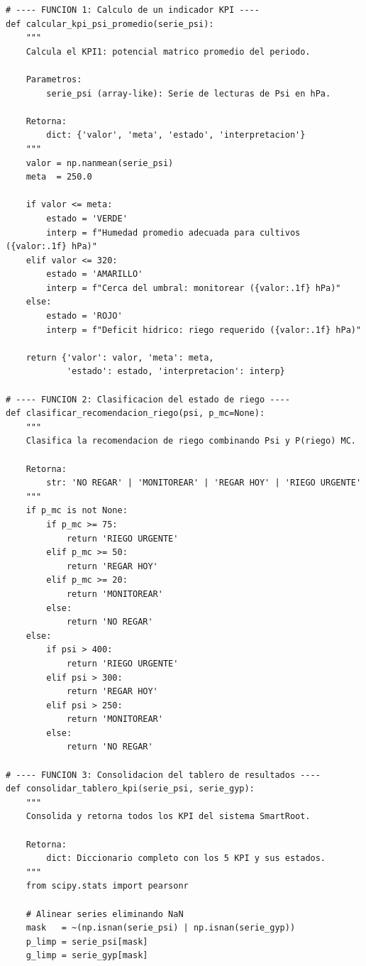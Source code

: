 \documentclass[12pt,a4paper]{article}
\begin{document}
\begin{lstlisting}[caption={Funciones para cálculo de indicadores, clasificación y consolidación de resultados.}, label=lst:funciones]
# ---- FUNCION 1: Calculo de un indicador KPI ----
def calcular_kpi_psi_promedio(serie_psi):
    """
    Calcula el KPI1: potencial matrico promedio del periodo.
    
    Parametros:
        serie_psi (array-like): Serie de lecturas de Psi en hPa.
    
    Retorna:
        dict: {'valor', 'meta', 'estado', 'interpretacion'}
    """
    valor = np.nanmean(serie_psi)
    meta  = 250.0
    
    if valor <= meta:
        estado = 'VERDE'
        interp = f"Humedad promedio adecuada para cultivos ({valor:.1f} hPa)"
    elif valor <= 320:
        estado = 'AMARILLO'
        interp = f"Cerca del umbral: monitorear ({valor:.1f} hPa)"
    else:
        estado = 'ROJO'
        interp = f"Deficit hidrico: riego requerido ({valor:.1f} hPa)"
    
    return {'valor': valor, 'meta': meta, 
            'estado': estado, 'interpretacion': interp}

# ---- FUNCION 2: Clasificacion del estado de riego ----
def clasificar_recomendacion_riego(psi, p_mc=None):
    """
    Clasifica la recomendacion de riego combinando Psi y P(riego) MC.
    
    Retorna:
        str: 'NO REGAR' | 'MONITOREAR' | 'REGAR HOY' | 'RIEGO URGENTE'
    """
    if p_mc is not None:
        if p_mc >= 75:
            return 'RIEGO URGENTE'
        elif p_mc >= 50:
            return 'REGAR HOY'
        elif p_mc >= 20:
            return 'MONITOREAR'
        else:
            return 'NO REGAR'
    else:
        if psi > 400:
            return 'RIEGO URGENTE'
        elif psi > 300:
            return 'REGAR HOY'
        elif psi > 250:
            return 'MONITOREAR'
        else:
            return 'NO REGAR'

# ---- FUNCION 3: Consolidacion del tablero de resultados ----
def consolidar_tablero_kpi(serie_psi, serie_gyp):
    """
    Consolida y retorna todos los KPI del sistema SmartRoot.
    
    Retorna:
        dict: Diccionario completo con los 5 KPI y sus estados.
    """
    from scipy.stats import pearsonr
    
    # Alinear series eliminando NaN
    mask   = ~(np.isnan(serie_psi) | np.isnan(serie_gyp))
    p_limp = serie_psi[mask]
    g_limp = serie_gyp[mask]
    

\end{lstlisting}
\end{document}
